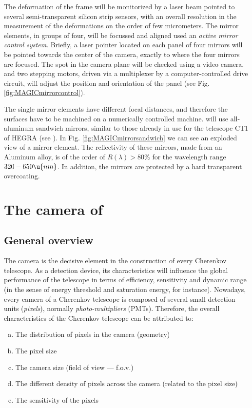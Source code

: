 The deformation  of  the frame  will  be monitorized  by a laser  beam
pointed to  several  semi-transparent silicon  strip  sensors, with an
overall resolution in the measurement of the deformations on the order
of  few micrometers. The  mirror elements, in  groups of four, will be
focussed    and   aligned  used    an  \emph{active    mirror  control
  system}\label{label:amcs}.  Briefly, a laser pointer located on each
panel of four mirrors  will   be pointed  towards  the center  of  the
camera, exactly to where the four mirrors are focused. The spot in the
camera  plane will be checked  using a video  camera, and two stepping
motors,   driven via  a   multiplexer by  a computer-controlled  drive
circuit, will adjust the position   and orientation of the panel  (see
Fig.\ref{fig:MAGICmirrorcontrol}).

\label{label:mirrorelement}%
The  single mirror  elements    have different  focal  distances,  and
therefore the surfaces have to be machined on a numerically controlled
machine. \MAGIC  will  use all-aluminum sandwich  mirrors,  similar to
those   already in    use  for the     telescope  CT1  of  HEGRA  (see
). In Fig. \ref{fig:MAGICmirrorsandwich} we
can see   an exploded view  of  a mirror element. The  reflectivity of
these mirrors,  made  from an  Aluminum  alloy,  is  of the  order  of
$R(\lambda)    > 80\%$ for the  wavelength   range $320-650\u{nm}$. In
addition, the mirrors are protected by a hard transparent overcoating.

\section{The camera of \MAGIC}

\subsection{General overview}

The camera is   the  decisive element in  the  construction   of every
Cherenkov  telescope. As a  detection device, its characteristics will
influence   the global performance  of    the  telescope in terms   of
efficiency,  sensitivity  and dynamic  range  (in the  sense of energy
threshold and saturation energy, for instance). Nowadays, every camera
of a Cherenkov telescope is  composed of several small detection units
(\emph{pixels}), normally \emph{photo-multipliers} (PMTs).  Therefore,
the   overall  characteristics of   the  Cherenkov   telescope can  be
attributed to:
% 
\begin{enumerate}[a.]
\item The distribution of pixels in the camera (geometry)
\item The pixel size
\item The camera size (field of view --- f.o.v.)
\item The different density  of pixels across  the camera  (related to
  the pixel size)
\item The sensitivity of the pixels
\end{enumerate}

